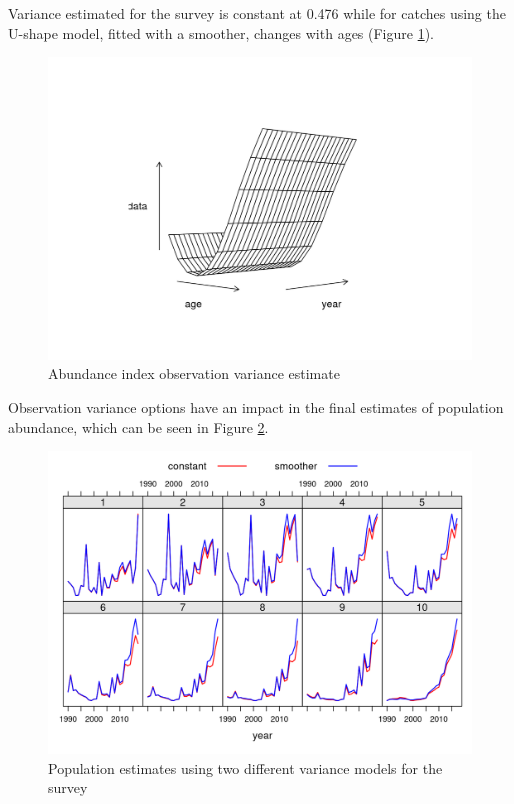 \documentclass[
]{book}
\begin{document}
Variance estimated for the survey is constant at 0.476 while for catches using the U-shape model, fitted with a smoother, changes with ages (Figure \ref{fig:vmod}).

\begin{figure}
\centering
\includegraphics{_bookdown_files/_main_files/figure-html/vmod-1.png}
\caption{\label{fig:vmod}Abundance index observation variance estimate}
\end{figure}

Observation variance options have an impact in the final estimates of population abundance, which can be seen in Figure \ref{fig:vmodimpact}.

\begin{figure}
\centering
\includegraphics{_bookdown_files/_main_files/figure-html/vmodimpact-1.png}
\caption{\label{fig:vmodimpact}Population estimates using two different variance models for the survey}
\end{figure}
\end{document}
